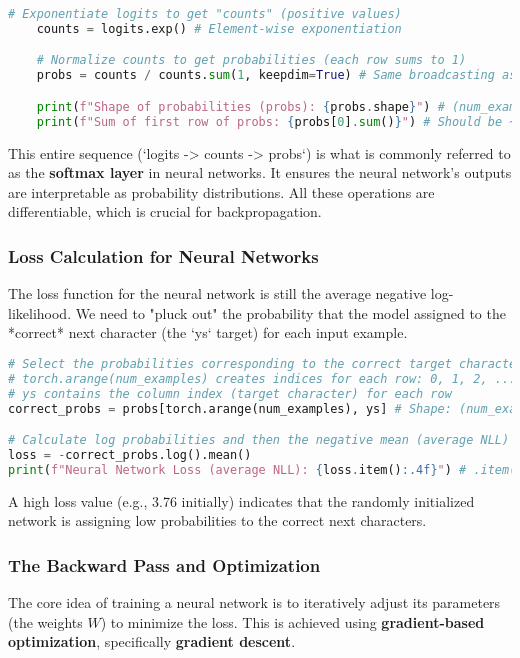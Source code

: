     \begin{lstlisting}[language=Python, caption=Softmax Transformation]
    # Exponentiate logits to get "counts" (positive values)
    counts = logits.exp() # Element-wise exponentiation

    # Normalize counts to get probabilities (each row sums to 1)
    probs = counts / counts.sum(1, keepdim=True) # Same broadcasting as before

    print(f"Shape of probabilities (probs): {probs.shape}") # (num_examples, 27)
    print(f"Sum of first row of probs: {probs[0].sum()}") # Should be ~1
    \end{lstlisting}

    This entire sequence (`logits -> counts -> probs`) is what is commonly referred to as the \textbf{softmax layer} in neural networks. It ensures the neural network's outputs are interpretable as probability distributions. All these operations are differentiable, which is crucial for backpropagation.

\subsubsection{Loss Calculation for Neural Networks}
The loss function for the neural network is still the average negative log-likelihood.
We need to "pluck out" the probability that the model assigned to the *correct* next character (the `ys` target) for each input example.

\begin{lstlisting}[language=Python, caption=Calculating Neural Network Loss]
# Select the probabilities corresponding to the correct target characters
# torch.arange(num_examples) creates indices for each row: 0, 1, 2, ...
# ys contains the column index (target character) for each row
correct_probs = probs[torch.arange(num_examples), ys] # Shape: (num_examples,)

# Calculate log probabilities and then the negative mean (average NLL)
loss = -correct_probs.log().mean()
print(f"Neural Network Loss (average NLL): {loss.item():.4f}") # .item() extracts scalar from tensor
\end{lstlisting}

A high loss value (e.g., 3.76 initially) indicates that the randomly initialized network is assigning low probabilities to the correct next characters.

\subsubsection{The Backward Pass and Optimization}
The core idea of training a neural network is to iteratively adjust its parameters (the weights $W$) to minimize the loss. This is achieved using \textbf{gradient-based optimization}, specifically \textbf{gradient descent}.

